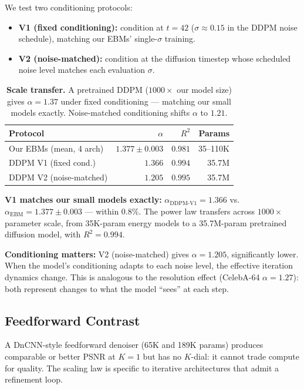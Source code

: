 \documentclass[letterpaper]{article}
\begin{document}
We test two conditioning protocols:
\begin{itemize}[leftmargin=*,topsep=2pt,itemsep=1pt]
\item \textbf{V1 (fixed conditioning):} condition at $t{=}42$
  ($\sigma \approx 0.15$ in the DDPM noise schedule), matching
  our EBMs' single-$\sigma$ training.
\item \textbf{V2 (noise-matched):} condition at the diffusion timestep
  whose scheduled noise level matches each evaluation $\sigma$.
\end{itemize}

\begin{table}[t]
\centering\small
\begin{tabular}{lrrr}
\toprule
Protocol & $\alpha$ & $R^2$ & Params \\
\midrule
Our EBMs (mean, 4 arch) & $1.377 \pm 0.003$ & $0.981$ & 35--110K \\
DDPM V1 (fixed cond.)   & $1.366$ & $0.994$ & 35.7M \\
DDPM V2 (noise-matched) & $1.205$ & $0.995$ & 35.7M \\
\bottomrule
\end{tabular}
\caption{\textbf{Scale transfer.}
A pretrained DDPM ($1000\times$ our model size) gives
$\alpha = 1.37$ under fixed conditioning ---
matching our small models exactly.
Noise-matched conditioning shifts $\alpha$ to $1.21$.}
\label{tab:ddpm}
\end{table}

\textbf{V1 matches our small models exactly:}
$\alpha_{\text{DDPM-V1}} = 1.366$ vs.\
$\alpha_{\text{EBM}} = 1.377 \pm 0.003$ ---
within $0.8\%$.
The power law transfers across $1000\times$ parameter scale,
from 35K-param energy models to a 35.7M-param pretrained
diffusion model, with $R^2 = 0.994$.

\textbf{Conditioning matters:}
V2 (noise-matched) gives $\alpha = 1.205$, significantly lower.
When the model's conditioning adapts to each noise level,
the effective iteration dynamics change.
This is analogous to the resolution effect (CelebA-64
$\alpha = 1.27$): both represent changes to what the model
``sees'' at each step.

\subsection{Feedforward Contrast}
\label{sec:dncnn}

A DnCNN-style feedforward denoiser (65K and 189K params) produces
comparable or better PSNR at $K{=}1$ but has no $K$-dial: it cannot
trade compute for quality.
The scaling law is specific to iterative architectures that admit
a refinement loop.
\end{document}
